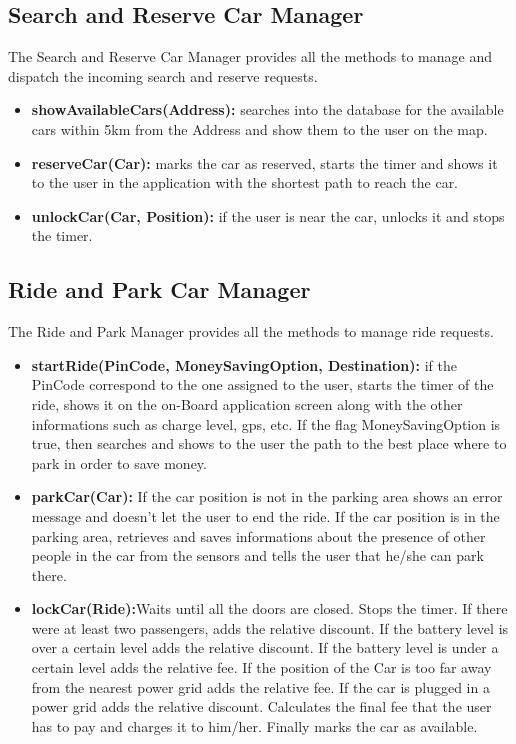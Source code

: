 \subsection{Search and Reserve Car Manager}
The Search and Reserve Car Manager provides all the methods to manage and dispatch the incoming search and reserve requests.\\
\begin{itemize}
\item \textbf{showAvailableCars(Address):} searches into the database for the available cars within 5km from the Address and show them to the user on the map.

\item \textbf{reserveCar(Car):} marks the car as reserved, starts the timer and shows it to the user in the application with the shortest path to reach the car.

\item \textbf{unlockCar(Car, Position):} if the user is near the car, unlocks it and stops the timer.
\end{itemize}
\subsection{Ride and Park Car Manager}
The Ride and Park Manager provides all the methods to manage ride requests.\\
\begin{itemize}
\item \textbf{startRide(PinCode, MoneySavingOption, Destination):} if the PinCode correspond to the one assigned to the user, starts the timer of the ride, shows it on the on-Board application screen along with the other informations such as charge level, gps, etc. If the flag MoneySavingOption is true, then searches and shows to the user the path to the best place where to park in order to save money.

\item \textbf{parkCar(Car):} If the car position is not in the parking area shows an error message and doesn't let the user to end the ride. If the car position is in the parking area, retrieves and saves informations about the presence of other people in the car from the sensors and tells the user that he/she can park there.

\item \textbf{lockCar(Ride):}Waits until all the doors are closed. Stops the timer. If there were at least two passengers, adds the relative discount. If the battery level is over a certain level adds the relative discount. If the battery level is under a certain level adds the relative fee. If the position of the Car is too far away from the nearest power grid adds the relative fee. If the car is plugged in a power grid adds the relative discount. Calculates the final fee that the user has to pay and charges it to him/her. Finally marks the car as available.
\end{itemize}

